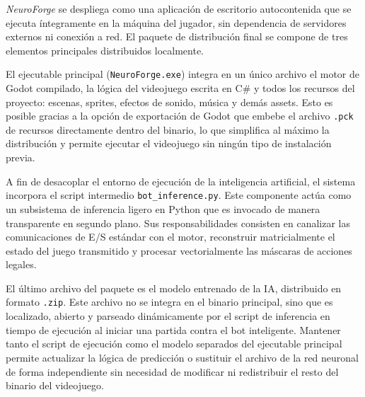 \textit{NeuroForge} se despliega como una aplicación de escritorio autocontenida que se ejecuta íntegramente en la máquina del jugador, sin dependencia de servidores externos ni conexión a red. El paquete de distribución final se compone de tres elementos principales distribuidos localmente.

El ejecutable principal (\texttt{NeuroForge.exe}) integra en un único archivo el motor de Godot compilado, la lógica del videojuego escrita en C\# y todos los recursos del proyecto: escenas, sprites, efectos de sonido, música y demás assets. Esto es posible gracias a la opción de exportación de Godot que embebe el archivo \texttt{.pck} de recursos directamente dentro del binario, lo que simplifica al máximo la distribución y permite ejecutar el videojuego sin ningún tipo de instalación previa.

A fin de desacoplar el entorno de ejecución de la inteligencia artificial, el sistema incorpora el script intermedio \texttt{bot\_inference.py}. Este componente actúa como un subsistema de inferencia ligero en Python que es invocado de manera transparente en segundo plano. Sus responsabilidades consisten en canalizar las comunicaciones de E/S estándar con el motor, reconstruir matricialmente el estado del juego transmitido y procesar vectorialmente las máscaras de acciones legales.

El último archivo del paquete es el modelo entrenado de la IA, distribuido en formato \texttt{.zip}. Este archivo no se integra en el binario principal, sino que es localizado, abierto y parseado dinámicamente por el script de inferencia en tiempo de ejecución al iniciar una partida contra el bot inteligente. Mantener tanto el script de ejecución como el modelo separados del ejecutable principal permite actualizar la lógica de predicción o sustituir el archivo de la red neuronal de forma independiente sin necesidad de modificar ni redistribuir el resto del binario del videojuego.